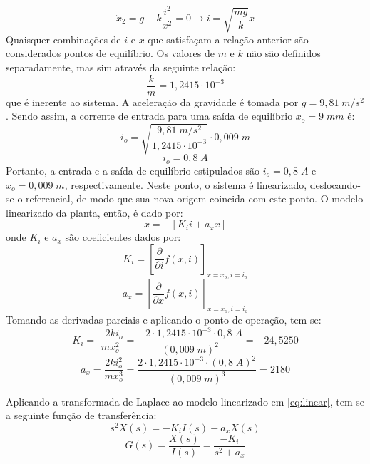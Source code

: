 \documentclass{ifacconf}
\begin{document}
\begin{equation}
    \ddot{x}_2 = g - k \frac{i^2}{x^2} = 0 \rightarrow i = \sqrt{\frac{mg}{k}}x
\end{equation}
Quaisquer combinações de $i$ e $x$ que satisfaçam a relação anterior são considerados pontos de equilíbrio. Os valores de $m$ e $k$ não são definidos separadamente, mas sim através da seguinte relação:
\begin{equation}
    \frac{k}{m} = 1,2415 \cdot 10^{-3}
\end{equation}
\noindent que é inerente ao sistema. A aceleração da gravidade é tomada por $g = 9,81 \; m/s^2$. Sendo assim, a corrente de entrada para uma saída de equilíbrio $x_o = 9\;mm$ é:
\begin{equation}
    i_o = \sqrt{\frac{9,81\;m/s^2}{1,2415 \cdot 10^{-3}}} \cdot 0,009\;m
\end{equation}
\begin{equation}
    i_o = 0,8\;A
\end{equation}
Portanto, a entrada e a saída de equilíbrio estipulados são $i_o = 0,8\;A$ e $x_o = 0,009\;m$, respectivamente. Neste ponto, o sistema é linearizado, deslocando-se o referencial, de modo que sua nova origem coincida com este ponto. O modelo linearizado da planta, então, é dado por:
\begin{equation}
    \ddot{x} = -[K_i i + a_x x]
    \label{eq:linear}
\end{equation}
onde $K_i$ e $a_x$ são coeficientes dados por:
\begin{equation}
    K_i = [\frac{\partial}{\partial i}f(x,i)]_{x = x_o, i = i_o}
\end{equation}
\begin{equation}
    a_x = [\frac{\partial}{\partial x}f(x,i)]_{x = x_o, i = i_o}
\end{equation}
Tomando as derivadas parciais e aplicando o ponto de operação, tem-se:
\begin{equation}
    K_i = \frac{-2ki_o}{mx_o^2} = \frac{-2\cdot1,2415 \cdot 10^{-3}\cdot 0,8\;A}{(0,009\;m)^2} = -24,5250
\end{equation}
\begin{equation}
    a_x = \frac{2ki_o^2}{mx_o^3} = \frac{2\cdot1,2415 \cdot 10^{-3}\cdot (0,8\;A)^2}{(0,009\;m)^3} = 2180
\end{equation}

Aplicando a transformada de Laplace ao modelo linearizado em \ref{eq:linear}, tem-se a seguinte função de transferência:
\begin{equation}
    s^2X(s) = -K_i I(s) - a_x X(s)
\end{equation}
\begin{equation}
    G(s) = \frac{X(s)}{I(s)} = \frac{-K_i}{s^2+a_x}
    \label{eq:FT1}
\end{equation}
\end{document}
